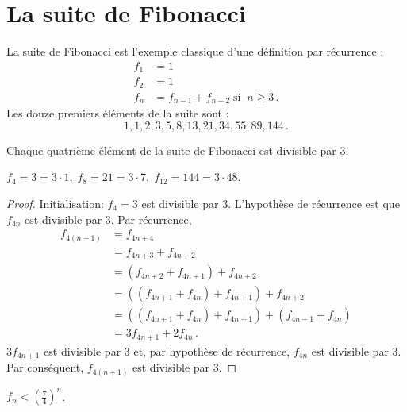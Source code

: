 
\section{La suite de Fibonacci}\label{s.induction-fibonacci}

La suite de Fibonacci est l'exemple classique d'une définition par récurrence :
\begin{align*}
f_1 &= 1\\
f_2 &= 1\\
f_n &= f_{n-1} + f_{n-2}\; \textrm{si} \;\; n \geq 3\,.
\end{align*}
Les douze premiers éléments de la suite sont :
\[
1, 1, 2, 3, 5, 8, 13, 21, 34, 55, 89, 144\,.
\]
\begin{theorem}\label{thm.fib-div3}
Chaque quatrième élément de la suite  de Fibonacci est divisible par $3$.
\end{theorem}

\begin{example}
$f_4=3=3\cdot 1,\; f_8=21=3\cdot 7,\; f_{12}=144=3\cdot 48$.
\end{example}

\begin{proof}
Initialisation: $f_4=3$ est divisible par $3$. L'hypothèse de récurrence est que $f_{4n}$ est divisible par $3$. Par récurrence,
\begin{align*}
f_{4(n+1)} &= f_{4n+4}\\
&= f_{4n+3}+f_{4n+2}\\
&= (f_{4n+2}+f_{4n+1})+f_{4n+2}\\
&= ((f_{4n+1}+f_{4n})+f_{4n+1})+f_{4n+2}\\
&= ((f_{4n+1}+f_{4n})+f_{4n+1})+(f_{4n+1}+f_{4n})\\
&= 3f_{4n+1}+2f_{4n}\,.
\end{align*}
$3f_{4n+1}$ est divisible par $3$ et, par hypothèse de récurrence, $f_{4n}$ est divisible par $3$. Par conséquent, $f_{4(n+1)}$ est divisible par $3$.
\end{proof}



\begin{theorem}\label{thm.seven-fourths}
$f_n < \left(\displaystyle\frac{7}{4}\right)^n$.
\end{theorem}

